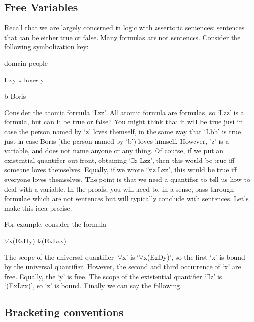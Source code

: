 \subsection{Free Variables}

Recall that we are largely concerned in logic with assertoric sentences: sentences that can be either true or false. Many formulas are not sentences. Consider the following symbolization key:
\begin{ekey}
\item[domain] people
\item[Lxy] x loves y
\item[b] Boris
\end{ekey}
Consider the atomic formula ‘Lzz’. All atomic formula are formulas, so ‘Lzz’ is a formula, but can it be true or false? You might think that it will be true just in case the person named by ‘z’ loves themself, in the same way that ‘Lbb’ is true just in case Boris (the person named by ‘b’) loves himself. However, ‘z’ is a variable, and does not name anyone or any thing. Of course, if we put an existential quantifier out front, obtaining ‘$\exists$z Lzz’, then this would be true iff someone loves themselves. Equally, if we wrote ‘$\forall$z Lzz’, this would be true iff everyone loves themselves. The point is that we need a quantifier to tell us how to deal with a variable. In the proofs, you will need to, in a sense, pass through formulae which are not sentences but will typically conclude with sentences. Let’s make this idea precise.

For example, consider the formula
\begin{center}
$\forall$x(Ex\eor Dy)\eif $\exists$z(Ex\eif Lzx)
\end{center}
The scope of the universal quantifier ‘$\forall$x’ is ‘$\forall$x(Ex\eor Dy)’, so the first ‘x’ is bound by the universal quantifier. However, the second and third occurrence of ‘x’ are free. Equally, the ‘y’ is free. The scope of the existential quantifier ‘$\exists$z’ is ‘(Ex\eif Lzx)’, so ‘z’ is bound. Finally we can say the following.

\subsection{Bracketing conventions}

